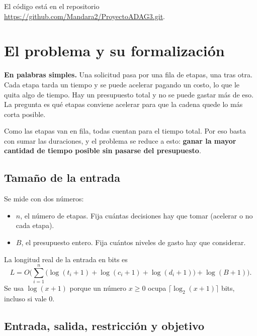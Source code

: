 \documentclass[11pt,a4paper]{article}
\theoremstyle{plano}
\begin{document}
El código está en el repositorio \url{https://github.com/Mandara2/ProyectoADAG3.git}.

\section{El problema y su formalización}

\textbf{En palabras simples.} Una solicitud pasa por una fila de etapas, una tras otra. Cada etapa tarda un tiempo y se puede acelerar pagando un costo, lo que le quita algo de tiempo. Hay un presupuesto total y no se puede gastar más de eso. La pregunta es qué etapas conviene acelerar para que la cadena quede lo más corta posible.

Como las etapas van en fila, todas cuentan para el tiempo total. Por eso basta con sumar las duraciones, y el problema se reduce a esto: \textbf{ganar la mayor cantidad de tiempo posible sin pasarse del presupuesto}.

\subsection{Tamaño de la entrada}

Se mide con dos números:
\begin{itemize}
  \item $n$, el número de etapas. Fija cuántas decisiones hay que tomar (acelerar o no cada etapa).
  \item $B$, el presupuesto entero. Fija cuántos niveles de gasto hay que considerar.
\end{itemize}
La longitud real de la entrada en bits es
\begin{equation}
  L = O\Big(\sum_{i=1}^{n}\big(\log(t_i+1) + \log(c_i+1) + \log(d_i+1)\big) + \log(B+1)\Big).
\end{equation}
Se usa $\log(x+1)$ porque un número $x\ge 0$ ocupa $\lceil\log_2(x+1)\rceil$ bits, incluso si vale 0.

\subsection{Entrada, salida, restricción y objetivo}
\end{document}
